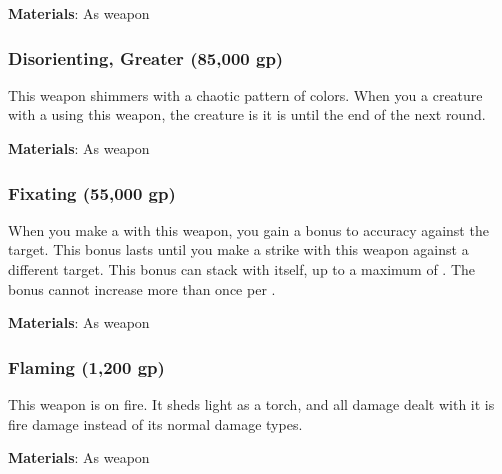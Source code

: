 \vspace{0.25em}
\textbf{Materials}: As weapon


\lowercase{\hypertarget{item:Disorienting, Greater}{}}\label{item:Disorienting, Greater}
\hypertarget{item:Disorienting, Greater}{\subsubsection{Disorienting, Greater\hfill{} (85,000 gp)}}

This weapon shimmers with a chaotic pattern of colors.
When you  a creature with a  using this weapon,
the creature is it is \disoriented until the end of the next round.



\vspace{0.25em}
\textbf{Materials}: As weapon


\lowercase{\hypertarget{item:Fixating}{}}\label{item:Fixating}
\hypertarget{item:Fixating}{\subsubsection{Fixating\hfill{} (55,000 gp)}}

When you make a  with this weapon, you gain a  bonus to accuracy against the target.
This bonus lasts until you make a strike with this weapon against a different target.
This bonus can stack with itself, up to a maximum of .
The bonus cannot increase more than once per .



\vspace{0.25em}
\textbf{Materials}: As weapon


\lowercase{\hypertarget{item:Flaming}{}}\label{item:Flaming}
\hypertarget{item:Flaming}{\subsubsection{Flaming\hfill{} (1,200 gp)}}

This weapon is on fire.
It sheds light as a torch, and all damage dealt with it is fire damage instead of its normal damage types.



\vspace{0.25em}
\textbf{Materials}: As weapon


